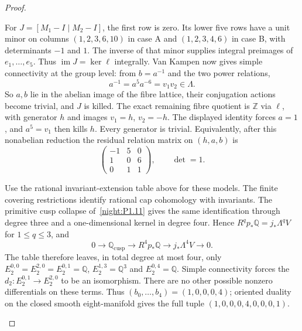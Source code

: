 \documentclass[11pt,a4paper]{article}
\numberwithin{equation}{section}
\theoremstyle{definition}
\begin{document}
\begin{proof}
\begin{enumerate}[label=\arabic*.]
For $J=[M_1-I\mid M_2-I]$, the first row is zero. Its lower five
rows have a unit minor on columns $(1,2,3,6,10)$ in case A and
$(1,2,3,4,6)$ in case B, with determinants $-1$ and $1$.
The inverse of that minor supplies integral preimages of
$e_1,\ldots,e_5$. Thus
$\operatorname{im}J=\ker\ell$ integrally. Van Kampen now gives
simple connectivity at the group level: from $b=a^{-1}$ and the
two power relations,
\[
 a^{-1}=a^5a^{-6}=v_1v_2\in\Lambda.
\]
So $a,b$ lie in the abelian image of the fibre lattice, their
conjugation actions become trivial, and $J$ is killed. The exact
remaining fibre quotient is $\mathbb Z$ via $\ell$, with generator
$h$ and images $v_1=h$, $v_2=-h$. The displayed identity forces
$a=1$, and $a^5=v_1$ then kills $h$. Every generator is trivial.
Equivalently, after this nonabelian reduction the residual relation
matrix on $(h,a,b)$ is
\[
 \begin{pmatrix}-1&5&0\\1&0&6\\0&1&1\end{pmatrix},
 \qquad\det=1.
\]

Use the rational invariant-extension table above for these models. The finite covering restrictions identify
rational cap cohomology with invariants. The primitive cusp collapse
of~\ref{night:P1.11} gives the same identification through degree
three and a one-dimensional kernel in degree four. Hence
$R^q p_*\mathbb Q=j_*\Lambda^qV$ for $1\le q\le3$, and
\[
 0\longrightarrow\mathbb Q_{\mathrm{cusp}}
 \longrightarrow R^4p_*\mathbb Q
 \longrightarrow j_*\Lambda^4V\longrightarrow0.
\]
The table therefore leaves, in total degree at most four, only
$E_2^{0,0}=E_2^{2,0}=E_2^{0,1}=\mathbb Q$,
$E_2^{1,3}=\mathbb Q^3$ and $E_2^{0,4}=\mathbb Q$.
Simple connectivity forces the $d_2:E_2^{0,1}\to E_2^{2,0}$ to be an isomorphism. There are no
other possible nonzero differentials on these terms. Thus
$(b_0,\ldots,b_4)=(1,0,0,0,4)$; oriented duality on the closed
smooth eight-manifold gives the full tuple
$(1,0,0,0,4,0,0,0,1)$.
\end{enumerate}
\end{proof}
\end{document}
